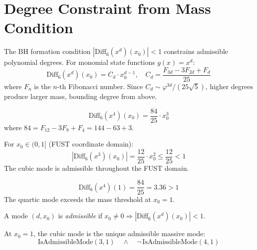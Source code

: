 \section{Degree Constraint from Mass Condition}
\label{sec:dim_degree_constraint}

The BH formation condition $|\mathrm{Diff}_6(x^d)(x_0)| < 1$ constrains admissible polynomial degrees.
For monomial state functions $g(x) = x^d$:
\[
\mathrm{Diff}_6(x^d)(x_0) = C_d \cdot x_0^{d-1}, \quad C_d = \frac{F_{3d} - 3F_{2d} + F_d}{25}
\]
where $F_n$ is the $n$-th Fibonacci number. Since $C_d \sim \varphi^{3d}/(25\sqrt{5})$,
higher degrees produce larger mass, bounding degree from above.

\begin{theorem}
\label{thm:dim_d6_quartic}
\leanok
\[
\mathrm{Diff}_6(x^4)(x_0) = \frac{84}{25} \cdot x_0^3
\]
where $84 = F_{12} - 3F_8 + F_4 = 144 - 63 + 3$.
\end{theorem}

\begin{theorem}
\label{thm:dim_cubic_admissible}
\leanok
For $x_0 \in (0, 1]$ (FUST coordinate domain):
\[
|\mathrm{Diff}_6(x^3)(x_0)| = \frac{12}{25} \cdot x_0^2 \leq \frac{12}{25} < 1
\]
The cubic mode is admissible throughout the FUST domain.
\end{theorem}

\begin{theorem}[Quartic Inadmissible at \texorpdfstring{$x_0 = 1$}{x0 = 1}]
\label{thm:dim_quartic_inadmissible}
\leanok
\[
\mathrm{Diff}_6(x^4)(1) = \frac{84}{25} = 3.36 > 1
\]
The quartic mode exceeds the mass threshold at $x_0 = 1$.
\end{theorem}

\begin{definition}
\label{def:dim_admissible_mode}
\leanok
A mode $(d, x_0)$ is \emph{admissible} if $x_0 \neq 0 \Rightarrow |\mathrm{Diff}_6(x^d)(x_0)| < 1$.
\end{definition}

\begin{theorem}[\texorpdfstring{$d_{\max} = 3$}{dmax = 3} at \texorpdfstring{$x_0 = 1$}{x0 = 1}]
\label{thm:dim_dmax_at_one}
\leanok
At $x_0 = 1$, the cubic mode is the unique admissible massive mode:
\[
\mathrm{IsAdmissibleMode}(3, 1) \quad \land \quad \lnot\, \mathrm{IsAdmissibleMode}(4, 1)
\]
\end{theorem}

